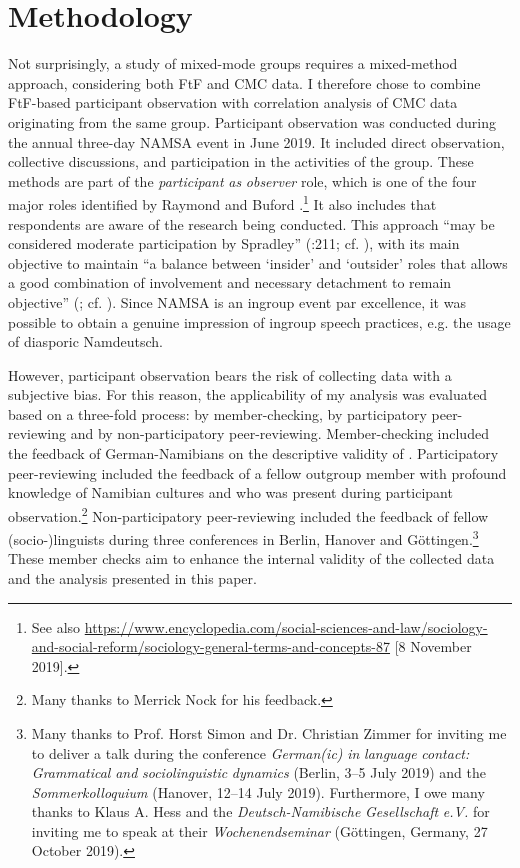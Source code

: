 \documentclass[output=paper]{langsci/langscibook}
\begin{document}
 
\section{Methodology}
\label{sec:radke:2}
 

Not surprisingly, a study of mixed-mode groups requires a mixed-method approach, considering both FtF and CMC data. I therefore chose to combine FtF-based participant observation with correlation analysis of CMC data originating from the same group. Participant observation was conducted during the annual three-day NAMSA event in June 2019. It included direct observation, collective discussions, and participation in the activities of the group. These methods are part of the \textit{participant} \textit{as} \textit{observer} role, which is one of the four major roles identified by Raymond \citet{gold_roles_1958} and Buford \citet{junker_field_1960}.\footnote{See also \url{https://www.encyclopedia.com/social-sciences-and-law/sociology-and-social-reform/sociology-general-terms-and-concepts-87} [8 November 2019].} It also includes that respondents are aware of the research being conducted. This approach “may be considered moderate participation by Spradley” (\citealt{howell_preparing_2018}:211; cf. \citealt[58]{spradley_participant_1980}), with its main objective to maintain “a balance between ‘insider’ and ‘outsider’ roles that allows a good combination of involvement and necessary detachment to remain objective” (\citealt[211]{howell_preparing_2018}; cf. \citealt[58]{spradley_participant_1980}). Since NAMSA is an ingroup event par excellence, it was possible to obtain a genuine impression of ingroup speech practices, e.g. the usage of diasporic Namdeutsch. 

However, participant observation bears the risk of collecting data with a subjective bias. For this reason, the applicability of my analysis was evaluated based on a three-fold process: by member-checking, by participatory peer-reviewing and by non-participatory peer-reviewing. Member-checking included the feedback of German-Namibians on the descriptive validity of . Participatory peer-reviewing included the feedback of a fellow outgroup member with profound knowledge of Namibian cultures and who was present during participant observation.\footnote{Many thanks to Merrick Nock for his feedback.} Non-participatory peer-reviewing included the feedback of fellow (socio-)linguists during three conferences in Berlin, Hanover and Göttingen.\footnote{Many thanks to Prof. Horst Simon and Dr. Christian Zimmer for inviting me to deliver a talk during the conference \textit{German(ic)} \textit{in} \textit{language} \textit{contact:} \textit{Grammatical} \textit{and} \textit{sociolinguistic} \textit{dynamics} (Berlin, 3--5 July 2019) and the \textit{Sommerkolloquium} (Hanover, 12--14 July 2019). Furthermore, I owe many thanks to Klaus A. Hess and the \textit{Deutsch-Namibische} \textit{Gesellschaft} \textit{e.V.} for inviting me to speak at their \textit{Wochenendseminar} (Göttingen, Germany, 27 October 2019).} These member checks aim to enhance the internal validity of the collected data and the analysis presented in this paper.
\end{document}
